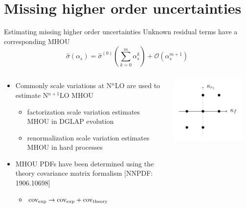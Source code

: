 \documentclass[aspectratio=169, 8pt,t]{beamer}
\begin{document}

\section{Missing higher order uncertainties}

\begin{frame}{Estimating missing higher order uncertainties}
  Unknown residual terms have a corresponding MHOU
  \begin{equation*}
    \hat{\sigma}\left(\alpha_s\right)=\hat{\sigma}^{(0)}\left(\sum_{k=0}^m \alpha_s^k\right)+\mathcal{O}\left(\alpha_s^{m+1}\right)
    \end{equation*}
  \begin{columns}[T]
    \begin{column}{0.49\textwidth}
      \begin{itemize}
        \item Commonly scale variations at N$^n$LO are used to estimate N$^{n+1}$LO MHOU
        \begin{itemize}
          \item factorization scale variation estimates MHOU in DGLAP evolution
          \item renormalization scale variation estimates MHOU in hard processes
        \end{itemize}
        \item MHOU PDFs have been determined using the theory covariance matrix formalism {\color{gray}\small [NNPDF: 1906.10698]}
        \begin{itemize}
          \item $\operatorfont{cov_{exp}} \rightarrow \operatorfont{cov_{exp}}+\operatorfont{cov_{theory}}$
        \end{itemize}
      \end{itemize}
    \end{column}
    \begin{column}{0.49\textwidth}
      \vspace*{-2em}
      \includegraphics[width=0.89\textwidth]{figures/7ptsv.png}

\end{column}
\end{columns}
\end{frame}
\end{document}
